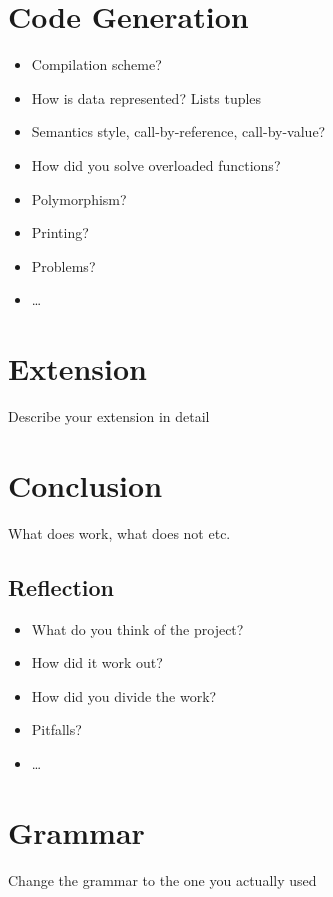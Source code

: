 \documentclass{report}
\begin{document}
\chapter{Code Generation}
\begin{itemize}
	\item Compilation scheme?
	\item How is data represented? Lists tuples
	\item Semantics style, call-by-reference, call-by-value?
	\item How did you solve overloaded functions?
	\item Polymorphism?
	\item Printing?
	\item Problems?
	\item\ldots
\end{itemize}

\chapter{Extension}
Describe your extension in detail

\chapter{Conclusion}
What does work, what does not etc.

\section{Reflection}
\begin{itemize}
	\item What do you think of the project?
	\item How did it work out?
	\item How did you divide the work?
	\item Pitfalls?
	\item \ldots
\end{itemize}

\appendix
\chapter{Grammar}
Change the grammar to the one you actually used
\end{document}

